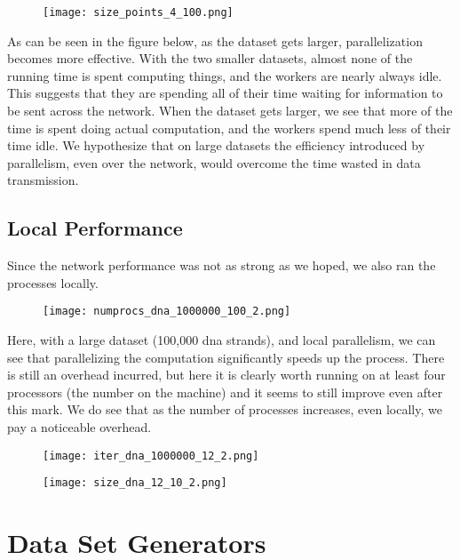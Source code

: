 \documentclass[12pt]{article}
\begin{document}
\begin{figure}[H]
\centering
\texttt{[image: size\_points\_4\_100.png]}
\end{figure}

As can be seen in the figure below, as the dataset gets larger, parallelization becomes more effective. With the two smaller datasets, almost none of the running time is spent computing things, and the workers are nearly always idle. This suggests that they are spending all of their time waiting for information to be sent across the network. When the dataset gets larger, we see that more of the time is spent doing actual computation, and the workers spend much less of their time idle. We hypothesize that on large datasets the efficiency introduced by parallelism, even over the network, would overcome the time wasted in data transmission.


\subsection{Local Performance}

Since the network performance was not as strong as we hoped, we also ran the processes locally.

\begin{figure}[H]
\centering
\texttt{[image: numprocs\_dna\_1000000\_100\_2.png]}
\end{figure}

Here, with a large dataset (100,000 dna strands), and local parallelism, we can see that parallelizing the computation significantly speeds up the process. There is still an overhead incurred, but here it is clearly worth running on at least four processors (the number on the machine) and it seems to still improve even after this mark. We do see that as the number of processes increases, even locally, we pay a noticeable overhead.

\begin{figure}[H]
\centering
\texttt{[image: iter\_dna\_1000000\_12\_2.png]}
\end{figure}

\begin{figure}[H]
\centering
\texttt{[image: size\_dna\_12\_10\_2.png]}
\end{figure}

\section{Data Set Generators}
\end{document}
